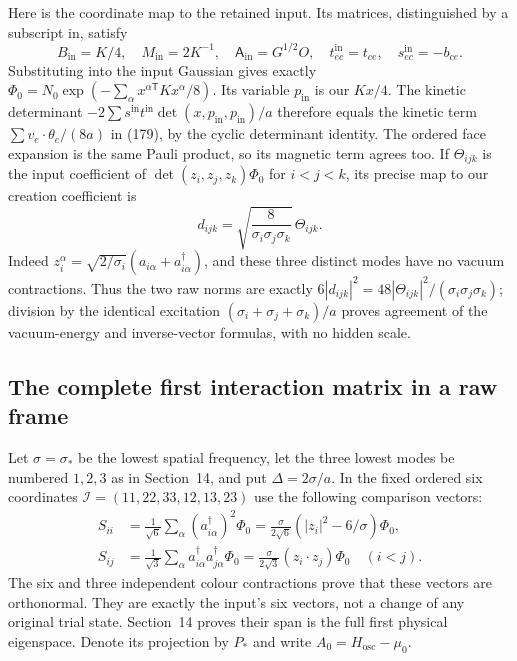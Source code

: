 \documentclass[11pt]{article}
\begin{document}
Here is the coordinate map to the retained input. Its matrices,
distinguished by a subscript $\mathrm{in}$, satisfy
\begin{equation}\label{eq:band-input-dictionary}
 B_{\mathrm{in}}=K/4,\quad M_{\mathrm{in}}=2K^{-1},\quad
 \mathsf A_{\mathrm{in}}=G^{1/2}O,\quad
 t^{\mathrm{in}}_{ec}=t_{ce},\quad s^{\mathrm{in}}_{ec}=-b_{ce}.
\end{equation}
Substituting into the input Gaussian gives exactly
$\Phi_0=N_0\exp(-\sum_\alpha x^{\alpha\mathsf T}Kx^\alpha/8)$.
Its variable $p_{\mathrm{in}}$ is our $Kx/4$.
The kinetic determinant $-2\sum s^{\mathrm{in}}t^{\mathrm{in}}
\det(x,p_{\mathrm{in}},p_{\mathrm{in}})/a$ therefore equals
the kinetic term $\sum v_e\cdot\theta_e/(8a)$ in
(179), by the cyclic determinant identity.
The ordered face expansion is the same Pauli product, so its magnetic
term agrees too. If $\Theta_{ijk}$ is the input coefficient of
$\det(z_i,z_j,z_k)\Phi_0$ for $i<j<k$, its precise map to
our creation coefficient is
\begin{equation}\label{eq:band-theta-map}
 d_{ijk}=\sqrt{\frac8{\sigma_i\sigma_j\sigma_k}}\,\Theta_{ijk}.
\end{equation}
Indeed $z_i^\alpha=\sqrt{2/\sigma_i}(a_{i\alpha}+a^\dagger_{i\alpha})$,
and these three distinct modes have no vacuum contractions. Thus
the two raw norms are exactly
$6|d_{ijk}|^2=48|\Theta_{ijk}|^2/(\sigma_i\sigma_j\sigma_k)$;
division by the identical excitation
$(\sigma_i+\sigma_j+\sigma_k)/a$ proves agreement of the
vacuum-energy and inverse-vector formulas, with no hidden scale.

\subsection{The complete first interaction matrix in a raw frame}

Let $\sigma=\sigma_*$ be the lowest spatial frequency, let the three
lowest modes be numbered $1,2,3$ as in Section~14, and put
$\Delta=2\sigma/a$. In the fixed ordered six coordinates
$\mathcal I=(11,22,33,12,13,23)$ use the following comparison vectors:
\begin{align}
 S_{ii}&=\frac1{\sqrt6}\sum_\alpha
                  (a^\dagger_{i\alpha})^2\Phi_0
       =\frac{\sigma}{2\sqrt6}(|z_i|^2-6/\sigma)\Phi_0,\nonumber\\
 S_{ij}&=\frac1{\sqrt3}\sum_\alpha
           a^\dagger_{i\alpha}a^\dagger_{j\alpha}\Phi_0
       =\frac{\sigma}{2\sqrt3}(z_i\cdot z_j)\Phi_0\quad(i<j).
 \label{eq:band-six-vectors}
\end{align}
The six and three independent colour contractions prove that these
vectors are orthonormal. They are exactly the input's six vectors,
not a change of any original trial state. Section~14 proves their
span is the full first physical eigenspace. Denote its projection
by $P_*$ and write $A_0=H_{\mathrm{osc}}-\mu_0$.
\end{document}
